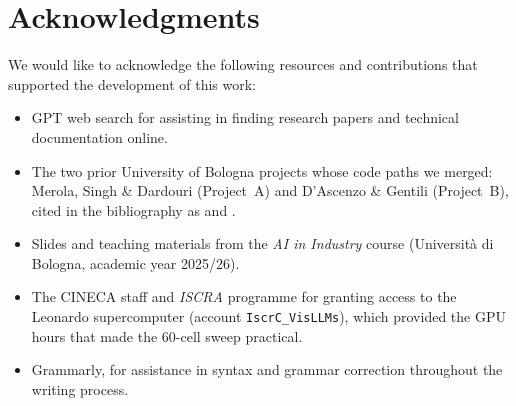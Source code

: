 
\section*{Acknowledgments}

We would like to acknowledge the following resources and contributions
that supported the development of this work:

\begin{itemize}
\item GPT web search for assisting in finding research papers and
      technical documentation online.
\item The two prior University of Bologna projects whose code paths
      we merged: Merola, Singh \& Dardouri (Project~A) and D'Ascenzo
      \& Gentili (Project~B), cited in the bibliography as
      \cite{projecta} and \cite{projectb}.
\item Slides and teaching materials from the
      \textit{AI in Industry} course (Università di Bologna,
      academic year 2025/26).
\item The CINECA staff and
      \textit{ISCRA} programme for granting access to the Leonardo
      supercomputer (account \texttt{IscrC\_VisLLMs}), which
      provided the GPU hours that made the 60-cell sweep practical.
\item Grammarly, for assistance in syntax and grammar correction
      throughout the writing process.
\end{itemize}
